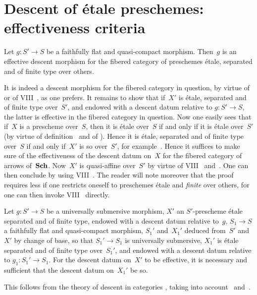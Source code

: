 \section{Descent of \'etale preschemes: effectiveness
criteria}
\label{IX.4}

\begin{proposition}
\label{IX.4.1}
Let $g\colon S'\to S$ be a faithfully flat and quasi-compact
morphism. Then~$g$ is an effective descent morphism for
the fibered category of preschemes \'etale,
separated and of finite type over others.
\end{proposition}

It is indeed a descent morphism for the fibered category
in question, by virtue of~ or of
VIII~, as one prefers. It remains to show that if~$X'$ is
\'etale, separated and of finite type over~$S'$, and endowed with a
descent datum relative to $g\colon S'\to S$, the
latter is effective in the fibered category in
question. Now one easily sees that if~$X$ is a prescheme
over~$S$, then
it is \'etale over~$S$ if and only if it is \'etale over~$S'$
(by virtue of definition~ and of \loccit {}). Hence it is \'etale, separated and of
finite type over~$S$ if and only if~$X'$ is so over~$S'$, \cf for
example~. Hence it suffices to make sure of the
effectiveness of the descent datum on~$X$ for the
fibered category of arrows of~$\mathbf{Sch}$. Now~$X'$ is
quasi-affine over~$S'$ by virtue of VIII~
and~. One can then conclude by using
VIII~. The reader will note moreover that the
proof requires less if one restricts oneself to preschemes
\'etale and \emph{finite} over others, for one can then invoke
VIII~ directly.

\begin{corollary}
\label{IX.4.2}
Let $g\colon S'\to S$ be a universally submersive morphism, $X'$
an
$S'$-prescheme
\'etale separated and of finite type, endowed with a
descent datum relative to~$g$, $S_1\to S$ a faithfully
flat and quasi-compact morphism, $S_1'$ and~$X_1'$ deduced
from~$S'$ and~$X'$ by change of base, so that $S_1'\to S_1$
is universally submersive, $X_1'$ is \'etale separated and
of finite type over~$S_1'$, and endowed with a descent datum
relative to $g_1\colon S_1'\to S_1$. For the
descent datum on~$X'$ to be effective, it is necessary and sufficient that the
descent datum on~$X_1'$ be so.
\end{corollary}

This follows from the theory of descent in
categories \cite{IX.D}, taking into account~ and~.

